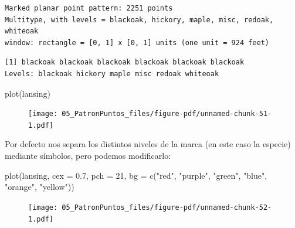 \documentclass[
  letterpaper,
  DIV=11,
  numbers=noendperiod]{scrreprt}
\newenvironment{Shaded}{\begin{snugshade}}{\end{snugshade}}
\newcommand{\AttributeTok}[1]{\textcolor[rgb]{0.40,0.45,0.13}{#1}}
\newcommand{\DecValTok}[1]{\textcolor[rgb]{0.68,0.00,0.00}{#1}}
\newcommand{\FloatTok}[1]{\textcolor[rgb]{0.68,0.00,0.00}{#1}}
\newcommand{\FunctionTok}[1]{\textcolor[rgb]{0.28,0.35,0.67}{#1}}
\newcommand{\NormalTok}[1]{\textcolor[rgb]{0.00,0.23,0.31}{#1}}
\newcommand{\SpecialCharTok}[1]{\textcolor[rgb]{0.37,0.37,0.37}{#1}}
\newcommand{\StringTok}[1]{\textcolor[rgb]{0.13,0.47,0.30}{#1}}
\begin{document}
\begin{verbatim}
Marked planar point pattern: 2251 points
Multitype, with levels = blackoak, hickory, maple, misc, redoak, whiteoak 
window: rectangle = [0, 1] x [0, 1] units (one unit = 924 feet)
\end{verbatim}

\begin{Shaded}
\end{Shaded}

\begin{verbatim}
[1] blackoak blackoak blackoak blackoak blackoak blackoak
Levels: blackoak hickory maple misc redoak whiteoak
\end{verbatim}

\begin{Shaded}
\begin{Highlighting}[]
\FunctionTok{plot}\NormalTok{(lansing)}
\end{Highlighting}
\end{Shaded}

\begin{figure}[H]

{\centering \texttt{[image: 05\_PatronPuntos\_files/figure-pdf/unnamed-chunk-51-1.pdf]}

}

\end{figure}

Por defecto nos separa los distintos niveles de la marca (en este caso
la especie) mediante símbolos, pero podemos modificarlo:

\begin{Shaded}
\begin{Highlighting}[]
\FunctionTok{plot}\NormalTok{(lansing, }\AttributeTok{cex =} \FloatTok{0.7}\NormalTok{, }\AttributeTok{pch =} \DecValTok{21}\NormalTok{, }\AttributeTok{bg =} \FunctionTok{c}\NormalTok{(}\StringTok{"red"}\NormalTok{, }\StringTok{"purple"}\NormalTok{, }\StringTok{"green"}\NormalTok{, }\StringTok{"blue"}\NormalTok{, }\StringTok{"orange"}\NormalTok{, }\StringTok{"yellow"}\NormalTok{))}
\end{Highlighting}
\end{Shaded}

\begin{figure}[H]

{\centering \texttt{[image: 05\_PatronPuntos\_files/figure-pdf/unnamed-chunk-52-1.pdf]}

}

\end{figure}
\end{document}

